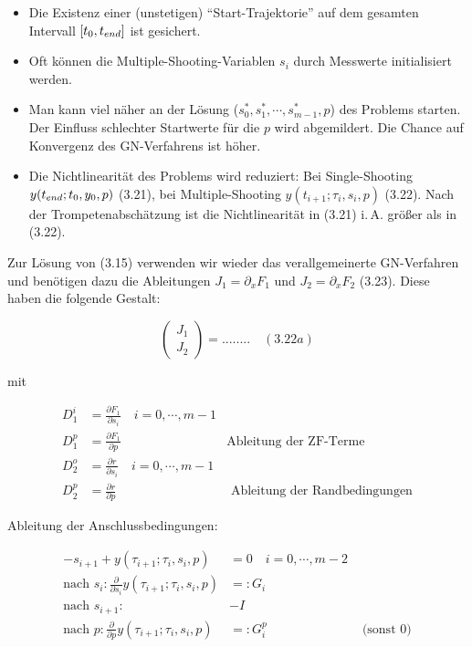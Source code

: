 \begin{itemize}
\item Die Existenz einer (unstetigen) "`Start-Trajektorie"' auf dem gesamten Intervall $[t_0,t_{end}]$ ist gesichert.
\item Oft können die Multiple-Shooting-Variablen $s_i$ durch Messwerte initialisiert werden.
\item Man kann viel näher an der Lösung ($s_0^*,s_1^*,\cdots,s_{m-1}^*, p$) des Problems starten. Der Einfluss schlechter Startwerte für die $p$ wird abgemildert. Die Chance auf Konvergenz des GN-Verfahrens ist höher.
\item Die Nichtlinearität des Problems wird reduziert: Bei Single-Shooting $y(t_{end}; t_0,y_0,p)$ (3.21), bei Multiple-Shooting $y(t_{i+1};\tau_i,s_i,p)$ (3.22). Nach der Trompetenabschätzung ist die Nichtlinearität in (3.21) i.\,A. größer als in (3.22).
\end{itemize}

Zur Lösung von (3.15) verwenden wir wieder das verallgemeinerte GN-Verfahren und benötigen dazu die Ableitungen $J_1 = \partial_x F_1$ und $J_2 = \partial_x F_2$ (3.23). Diese haben die folgende Gestalt:

\[ \begin{pmatrix} J_1 \\ J_2 \end{pmatrix} = ........ \quad (3.22a)\]

mit

\begin{align*}
D_1^i &= \frac{\partial F_1}{\partial s_i} \quad i=0,\cdots,m-1 \\
D_1^p &= \frac{\partial F_1}{\partial p} & \text{Ableitung der ZF-Terme} \\
D_2^o &= \frac{\partial r}{\partial s_i} \quad i=0,\cdots,m-1 \\
D_2^p &= \frac{\partial r}{\partial p} & \text{ Ableitung der Randbedingungen}
\end{align*}

Ableitung der Anschlussbedingungen:

\begin{align*}
-s_{i+1} + y(\tau_{i+1}; \tau_i, s_i, p) &= 0 \quad i=0,\cdots,m-2 \\
\text{nach }s_i: \frac{\partial}{\partial s_i} y(\tau_{i+1}; \tau_i, s_i, p) &=: G_i \\
\text{nach }s_{i+1}: &-I \\
\text{nach }p:  \frac{\partial}{\partial p}y(\tau_{i+1}; \tau_i, s_i, p) &=: G_i^p & \text{ (sonst 0)}\\
\end{align*}

